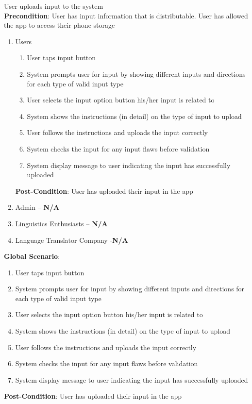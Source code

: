 \item User uploads input to the system
	\\ \textbf{Precondition}: User has input information that is distributable. User has allowed the app to access their phone storage
	\begin{enumerate}[{\bf VP1.}]
		\item Users
		\begin{enumerate}[{\bf 1.}]
			\item User taps input button 
			\item System prompts user for input by showing different inputs and directions for each type of valid input type
			\item User selects the input option button his/her input is  related to
			\item System shows the instructions (in detail) on the type of input to upload
			\item User follows the instructions and uploads the input correctly
			\item System checks the input for any input flaws before validation
			\item System display message to user indicating the input has successfully uploaded
		\end{enumerate}
		\textbf{Post-Condition}: User has uploaded their input in the app
		\item Admin – \textbf{N/A}
		\item Linguistics Enthusiasts – \textbf{N/A}
		\item Language Translator Company -\textbf{N/A}
	\end{enumerate}
	\textbf{Global Scenario}:
	\begin{enumerate}[{\bf 1.}]
		\item User taps input button 
		\item System prompts user for input by showing different inputs and directions for each type of valid input type
		\item User selects the input option button his/her input is  related to
		\item System shows the instructions (in detail) on the type of input to upload
		\item User follows the instructions and uploads the input correctly
		\item System checks the input for any input flaws before validation
		\item System display message to user indicating the input has successfully uploaded
	\end{enumerate}
	\textbf{Post-Condition}: User has uploaded their input in the app